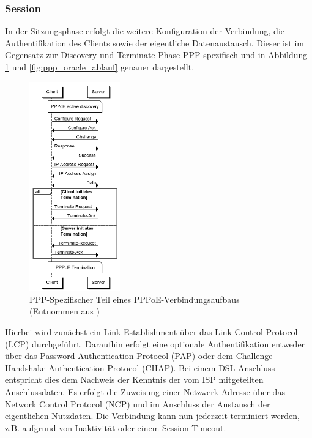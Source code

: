 \documentclass[journal,11pt]{IEEEtran}
\begin{document}
\subsubsection{Session}
In der Sitzungsphase erfolgt die weitere Konfiguration der Verbindung, die Authentifikation des
Clients sowie der eigentliche Datenaustausch. Dieser ist im Gegensatz zur Discovery und Terminate
Phase PPP-spezifisch und in Abbildung \ref{fig:ppp_startnetworks} und \ref{fig:ppp_oracle_ablauf} genauer dargestellt.
%
\begin{figure}[h!]
 \centering
  \includegraphics[width=0.35\textwidth]{img/pppoe_sequenz2.png}
 \caption{PPP-Spezifischer Teil eines PPPoE-Verbindungsaufbaus (Entnommen aus \cite{ppp_startnetworks})}
 \label{fig:ppp_startnetworks}
\end{figure}
%
Hierbei wird zunächst ein Link Establishment über das Link Control Protocol (LCP) durchgeführt.
Daraufhin erfolgt eine optionale Authentifikation entweder über das Password Authentication Protocol (PAP)
oder dem Challenge-Handshake Authentication Protocol (CHAP). Bei einem DSL-Anschluss entspricht dies
dem Nachweis der Kenntnis der vom ISP mitgeteilten Anschlussdaten. Es erfolgt die Zuweisung einer
Netzwerk-Adresse über das Network Control Protocol (NCP) und im Anschluss der Austausch der
eigentlichen Nutzdaten. Die Verbindung kann nun jederzeit terminiert werden, z.B.
aufgrund von Inaktivität oder einem Session-Timeout.
%
%
\end{document}
